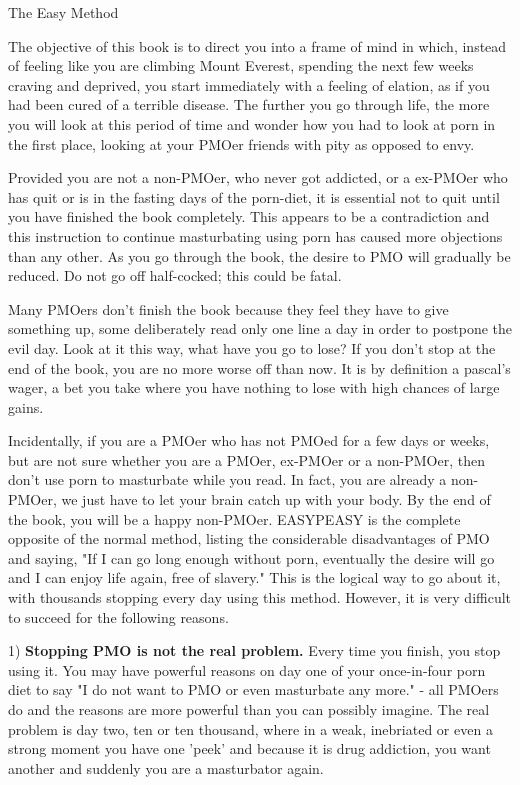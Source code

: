 The Easy Method

The objective of this book is to direct you into a frame of mind in which, instead of feeling like you are climbing Mount Everest, spending the next few weeks craving and deprived, you start immediately with a feeling of elation, as if you had been cured of a terrible disease. The further you go through life, the more you will look at this period of time and wonder how you had to look at porn in the first place, looking at your PMOer friends with pity as opposed to envy.

Provided you are not a non-PMOer, who never got addicted, or a ex-PMOer who has quit or is in the fasting days of the porn-diet, it is essential not to quit until you have finished the book completely. This appears to be a contradiction and this instruction to continue masturbating using porn has caused more objections than any other. As you go through the book, the desire to PMO will gradually be reduced. Do not go off half-cocked; this could be fatal.

Many PMOers don't finish the book because they feel they have to give something up, some deliberately read only one line a day in order to postpone the evil day. Look at it this way, what have you go to lose? If you don't stop at the end of the book, you are no more worse off than now. It is by definition a pascal's wager, a bet you take where you have nothing to lose with high chances of large gains.

Incidentally, if you are a PMOer who has not PMOed for a few days or weeks, but are not sure whether you are a PMOer, ex-PMOer or a non-PMOer, then don't use porn to masturbate while you read. In fact, you are already a non-PMOer, we just have to let your brain catch up with your body. By the end of the book, you will be a happy non-PMOer. EASYPEASY is the complete opposite of the normal method, listing the considerable disadvantages of PMO and saying,
"If I can go long enough without porn, eventually the desire will go and I can enjoy life again, free of slavery."
This is the logical way to go about it, with thousands stopping every day using this method. However, it is very difficult to succeed for the following reasons.

1) \textbf{Stopping PMO is not the real problem.} Every time you finish, you stop using it. You may have powerful reasons on day one of your once-in-four porn diet to say "I do not want to PMO or even masturbate any more." - all PMOers do and the reasons are more powerful than you can possibly imagine. The real problem is day two, ten or ten thousand, where in a weak, inebriated or even a strong moment you have one 'peek' and because it is drug addiction, you want another and suddenly you are a masturbator again.

